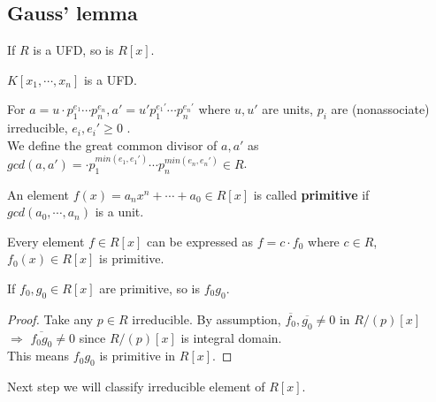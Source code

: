 \subsection{Gauss' lemma}
\begin{theorem}
     If  $ R  $ is a UFD, so is  $ R[x] $.
\end{theorem}
\begin{example}
      $ K[x_1,\cdots,x_n ] $ is a UFD.
\end{example}
For  $ a=u\cdot p_1^{e_1}\cdots p_n^{e_n},a'=u'p_1^{e_1'}\cdots p_n^{e_n'} $ where  $ u,u' $ are units,  $ p_i $ are (nonassociate) irreducible,  $ e_i,e_i' \geq 0 $ .\\
We define the great common divisor of  $ a,a'  $ as  $ gcd(a,a')=\cdot p_1^{min(e_1,e_1')}\cdots p_n^{min(e_n,e_n')}\in R $. 
\begin{definition}
     An element  $ f(x)=a_nx^n+\cdots +a_0\in R[x]  $ is called \textbf{primitive} if  $ gcd(a_0,\cdots,a_n) $ is a unit. 
\end{definition}
\begin{proposition}
     Every element  $ f\in R[x] $ can be expressed as  $ f=c\cdot f_0 $ where  $ c\in R  $,  $ f_0(x)\in R[x] $ is primitive.
\end{proposition}
\begin{theorem}
     If  $ f_0,g_0\in R[x] $ are primitive, so is  $ f_0g_0 $.  
\end{theorem}
\begin{proof}
     Take any  $ p\in R  $ irreducible. By assumption,  $ \overline{f_0},\overline{g_0}\not=0 $ in  $ R/(p)[x] $\\
      $ \Rightarrow $  $ \overline{f_0g_0}\not=0 $ since  $ R/(p)[x] $ is integral domain.\\
      This means  $ f_0g_0 $ is primitive in  $ R[x] $.   
\end{proof}
Next step we will classify irreducible element of  $ R[x] $. 